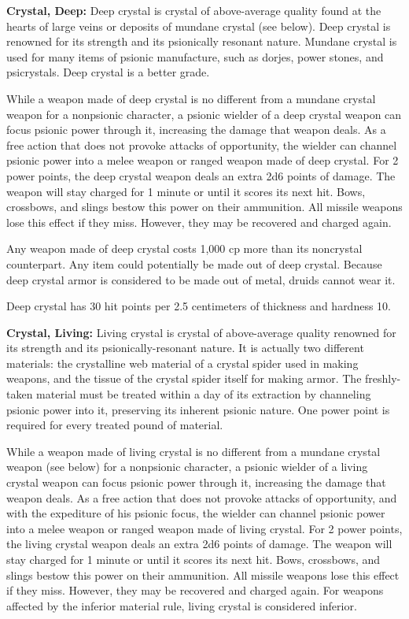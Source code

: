 \textbf{Crystal, Deep:} Deep crystal is crystal of above-average quality found at the hearts of large veins or deposits of mundane crystal (see below). Deep crystal is renowned for its strength and its psionically resonant nature. Mundane crystal is used for many items of psionic manufacture, such as dorjes, power stones, and psicrystals. Deep crystal is a better grade.

While a weapon made of deep crystal is no different from a mundane crystal weapon for a nonpsionic character, a psionic wielder of a deep crystal weapon can focus psionic power through it, increasing the damage that weapon deals. As a free action that does not provoke attacks of opportunity, the wielder can channel psionic power into a melee weapon or ranged weapon made of deep crystal. For 2 power points, the deep crystal weapon deals an extra 2d6 points of damage. The weapon will stay charged for 1 minute or until it scores its next hit. Bows, crossbows, and slings bestow this power on their ammunition. All missile weapons lose this effect if they miss. However, they may be recovered and charged again.

Any weapon made of deep crystal costs 1,000 cp more than its noncrystal counterpart. Any item could potentially be made out of deep crystal. Because deep crystal armor is considered to be made out of metal, druids cannot wear it.

Deep crystal has 30 hit points per 2.5 centimeters of thickness and hardness 10.

\textbf{Crystal, Living:} Living crystal is crystal of above-average quality renowned for its strength and its psionically-resonant nature. It is actually two different materials: the crystalline web material of a crystal spider used in making weapons, and the tissue of the crystal spider itself for making armor. The freshly-taken material must be treated within a day of its extraction by channeling psionic power into it, preserving its inherent psionic nature. One power point is required for every treated pound of material.

While a weapon made of living crystal is no different from a mundane crystal weapon (see below) for a nonpsionic character, a psionic wielder of a living crystal weapon can focus psionic power through it, increasing the damage that weapon deals. As a free action that does not provoke attacks of opportunity, and with the expediture of his psionic focus, the wielder can channel psionic power into a melee weapon or ranged weapon made of living crystal. For 2 power points, the living crystal weapon deals an extra 2d6 points of damage. The weapon will stay charged for 1 minute or until it scores its next hit. Bows, crossbows, and slings bestow this power on their ammunition. All missile weapons lose this effect if they miss. However, they may be recovered and charged again. For weapons affected by the inferior material rule, living crystal is considered inferior.

